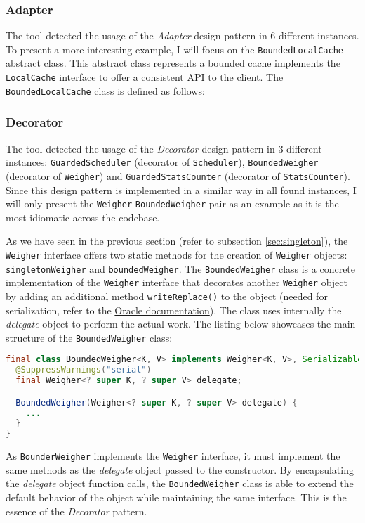 \subsubsection{Adapter}

The tool detected the usage of the \textit{Adapter} design pattern in 6 different instances. To present a more interesting example, I will focus on the \texttt{BoundedLocalCache} abstract class. This abstract class represents a bounded cache implements the \texttt{LocalCache} interface to offer a consistent API to the client. The \texttt{BoundedLocalCache} class is defined as follows:

\subsubsection{Decorator}

The tool detected the usage of the \textit{Decorator} design pattern in 3 different instances: \texttt{GuardedScheduler} (decorator of \texttt{Scheduler}), \texttt{BoundedWeigher} (decorator of \texttt{Weigher}) and \texttt{GuardedStatsCounter} (decorator of \texttt{StatsCounter}). Since this design pattern is implemented in a similar way in all found instances, I will only present the \texttt{Weigher}-\texttt{BoundedWeigher} pair as an example as it is the most idiomatic across the codebase.

As we have seen in the previous section (refer to subsection \ref{sec:singleton}), the \texttt{Weigher} interface offers two static methods for the creation of \texttt{Weigher} objects: \texttt{singletonWeigher} and \texttt{boundedWeigher}. The \texttt{BoundedWeigher} class is a concrete implementation of the \texttt{Weigher} interface that decorates another \texttt{Weigher} object by adding an additional method \texttt{writeReplace()} to the object (needed for serialization, refer to the \href{https://docs.oracle.com/javase//7/docs/technotes/guides/serialization/examples/symbol/index3.html}{Oracle documentation}). The class uses internally the \textit{delegate} object to perform the actual work. The listing below showcases the main structure of the \texttt{BoundedWeigher} class:

\begin{lstlisting}[language=Java]
final class BoundedWeigher<K, V> implements Weigher<K, V>, Serializable {
  @SuppressWarnings("serial")
  final Weigher<? super K, ? super V> delegate;

  BoundedWeigher(Weigher<? super K, ? super V> delegate) {
    ...
  }
}

\end{lstlisting}

\noindent As \texttt{BounderWeigher} implements the \texttt{Weigher} interface, it must implement the same methods as the \textit{delegate} object passed to the constructor. By encapsulating the \textit{delegate} object function calls, the \texttt{BoundedWeigher} class is able to extend the default behavior of the object while maintaining the same interface. This is the essence of the \textit{Decorator} pattern.


